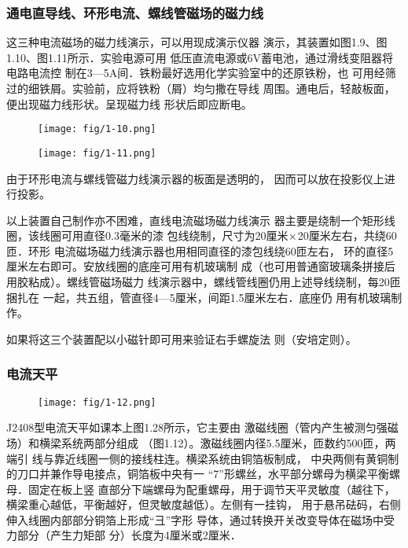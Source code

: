 \subsubsection{通电直导线、环形电流、螺线管磁场的磁力线}
这三种电流磁场的磁力线演示，可以用现成演示仪器
演示，其装置如图1.9、图1.10、图1.11所示．实验电源可用
低压直流电源或6V蓄电池，通过滑线变阻器将电路电流控
制在3—5A间．铁粉最好选用化学实验室中的还原铁粉，也
可用经筛过的细铁屑。实验前，应将铁粉（屑）均匀撒在导线
周围。通电后，轻敲板面，便出现磁力线形状。呈现磁力线
形状后即应断电。

\begin{figure}[htp]\centering
    \begin{minipage}[t]{0.48\textwidth}
    \centering
\texttt{[image: fig/1-10.png]}
    \caption{}
    \end{minipage}
    \begin{minipage}[t]{0.48\textwidth}
    \centering
\texttt{[image: fig/1-11.png]}
    \caption{}
    \end{minipage}
    \end{figure}

由于环形电流与螺线管磁力线演示器的板面是透明的，
因而可以放在投影仪上进行投影。

以上装置自己制作亦不困难，直线电流磁场磁力线演示
器主要是绕制一个矩形线圈，该线圈可用直径0.3毫米的漆
包线绕制，尺寸为20厘米$\times$20厘米左右，共绕60匝．环形
电流磁场磁力线演示器也用相同直径的漆包线绕60匝左右，
环的直径5厘米左右即可。安放线圈的底座可用有机玻璃制
成（也可用普通窗玻璃条拼接后用胶粘成）。螺线管磁场磁力
线演示器中，螺线管线圈仍用上述导线绕制，每20匝捆扎在
一起，共五组，管直径4—5厘米，间距1.5厘米左右．底座仍
用有机玻璃制作。

如果将这三个装置配以小磁针即可用来验证右手螺旋法
则（安培定则）。


\subsubsection{电流天平}
\begin{figure}[htp]
    \centering
\texttt{[image: fig/1-12.png]}
    \caption{}
\end{figure}

J2408型电流天平如课本上图1.28所示，它主要由
激磁线圈（管内产生被测匀强磁场）和横梁系统两部分组成
（图1.12）。激磁线圈内径5.5厘米，匝数约500匝，两端引
线与靠近线圈一侧的接线柱连。横梁系统由铜箔板制成，
中央两侧有黄铜制的刀口并兼作导电接点，铜箔板中央有一
“7”形螺丝，水平部分螺母为横梁平衡螺母．固定在板上竖
直部分下端螺母为配重螺母，用于调节天平灵敏度（越往下，
横梁重心越低，平衡越好，但灵敏度越低）。左侧有一挂钩，
用于悬吊砝码，右侧伸入线圈内部部分铜箔上形成“彐”字形
导体，通过转换开关改变导体在磁场中受力部分（产生力矩部
分）长度为4厘米或2厘米．

